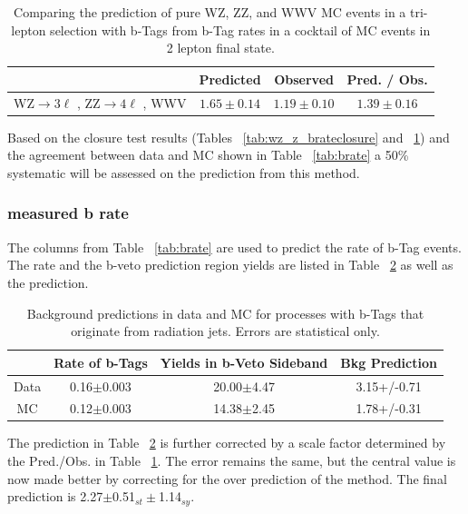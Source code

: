 \begin{table}[ht!]
\begin{center}
\caption{\small \label{tab:mcsoup_brateclosure} Comparing the prediction of pure WZ, ZZ, and WWV MC events in a tri-lepton selection with b-Tags from b-Tag rates in a cocktail of MC events in 2 lepton final state.}
\begin{tabular}{c|ccc}\hline
                                                                                               & Predicted             & Observed          & Pred. / Obs.\\
\hline \hline
WZ$\rightarrow 3\ell $ , ZZ$\rightarrow 4\ell $ , WWV & $1.65 \pm 0.14$ & $1.19\pm0.10$ & $1.39 \pm 0.16$ \\
\hline
\end{tabular}
\end{center}
\end{table}

Based on the closure test results (Tables ~\ref{tab:wz_z_brateclosure} and ~\ref{tab:mcsoup_brateclosure}) and the agreement between data and MC shown in Table ~\ref{tab:brate} a 50\% systematic will be assessed on the prediction from this method.\\
		
		
        		\subsubsection{measured b rate}
		The columns from Table ~\ref{tab:brate} are used to predict the rate of b-Tag events. The rate and the b-veto prediction region yields are listed in Table ~\ref{tab:brate_prediction} as well as the prediction.
\begin{table}[ht!]
\begin{center}
\caption{\small \label{tab:brate_prediction} Background predictions in data and MC for processes with b-Tags that originate from radiation jets. Errors are statistical only.}
\begin{tabular}{c|ccc}\hline
	   & Rate of b-Tags	& Yields in b-Veto Sideband &	Bkg Prediction \\ \hline
Data   & 0.16$\pm$0.003	& 20.00$\pm$4.47            & 3.15+/-0.71 \\
MC	   & 0.12$\pm$0.003	& 14.38$\pm$2.45            & 1.78+/-0.31 \\
\hline
\end{tabular}
\end{center}
\end{table}

The prediction in Table ~\ref{tab:brate_prediction} is further corrected by a scale factor determined by the Pred./Obs. in Table ~\ref{tab:mcsoup_brateclosure}. The error remains the same, but the central value is now made better by correcting for the over prediction of the method. The final prediction is 2.27$\pm$0.51$_{st} \pm$1.14$_{sy}$.
		